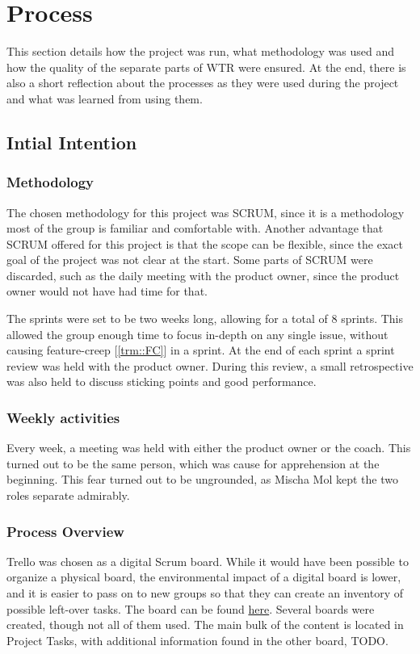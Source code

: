 \section{Process}
This section details how the project was run, what methodology was used and how the quality of the separate parts of WTR were ensured.
At the end, there is also a short reflection about the processes as they were used during the project and what was learned from using them.

\subsection{Intial Intention}
\subsubsection{Methodology}
The chosen methodology for this project was SCRUM, since it is a methodology most of the group is familiar and comfortable with.
Another advantage that SCRUM offered for this project is that the scope can be flexible, since the exact goal of the project was not clear at the start.
Some parts of SCRUM were discarded, such as the daily meeting with the product owner, since the product owner would not have had time for that.

The sprints were set to be two weeks long, allowing for a total of 8 sprints.
This allowed the group enough time to focus in-depth on any single issue, without causing feature-creep [\ref{trm::FC}] in a sprint.
At the end of each sprint a sprint review was held with the product owner.
During this review, a small retrospective was also held to discuss sticking points and good performance.

\subsubsection{Weekly activities}
Every week, a meeting was held with either the product owner or the coach.
This turned out to be the same person, which was cause for apprehension at the beginning.
This fear turned out to be ungrounded, as Mischa Mol kept the two roles separate admirably.

\subsubsection{Process Overview}
Trello was chosen as a digital Scrum board.
While it would have been possible to organize a physical board, the environmental impact of a digital board is lower, and it is easier to pass on to new groups so that they can create an inventory of possible left-over tasks.
The board can be found \href{https://trello.com/willytherobot/home}{here}.
Several boards were created, though not all of them used.
The main bulk of the content is located in Project Tasks, with additional information found in the other board, TODO.

